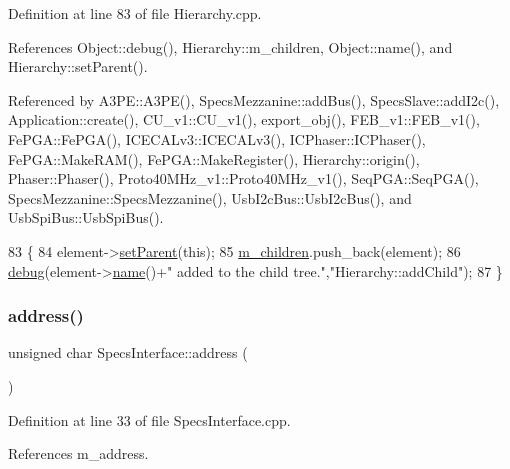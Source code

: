 Definition at line 83 of file Hierarchy.\+cpp.



References Object\+::debug(), Hierarchy\+::m\+\_\+children, Object\+::name(), and Hierarchy\+::set\+Parent().



Referenced by A3\+P\+E\+::\+A3\+P\+E(), Specs\+Mezzanine\+::add\+Bus(), Specs\+Slave\+::add\+I2c(), Application\+::create(), C\+U\+\_\+v1\+::\+C\+U\+\_\+v1(), export\+\_\+obj(), F\+E\+B\+\_\+v1\+::\+F\+E\+B\+\_\+v1(), Fe\+P\+G\+A\+::\+Fe\+P\+G\+A(), I\+C\+E\+C\+A\+Lv3\+::\+I\+C\+E\+C\+A\+Lv3(), I\+C\+Phaser\+::\+I\+C\+Phaser(), Fe\+P\+G\+A\+::\+Make\+R\+A\+M(), Fe\+P\+G\+A\+::\+Make\+Register(), Hierarchy\+::origin(), Phaser\+::\+Phaser(), Proto40\+M\+Hz\+\_\+v1\+::\+Proto40\+M\+Hz\+\_\+v1(), Seq\+P\+G\+A\+::\+Seq\+P\+G\+A(), Specs\+Mezzanine\+::\+Specs\+Mezzanine(), Usb\+I2c\+Bus\+::\+Usb\+I2c\+Bus(), and Usb\+Spi\+Bus\+::\+Usb\+Spi\+Bus().


\begin{DoxyCode}
83                                           \{
84   element->\hyperlink{classHierarchy_a585ad1aeec16077a0e532ab8b4fc557b}{setParent}(\textcolor{keyword}{this});
85   \hyperlink{classHierarchy_a038816763941fd4a930504917f60483b}{m\_children}.push\_back(element);
86   \hyperlink{classObject_aac010553f022165573714b7014a15f0d}{debug}(element->\hyperlink{classObject_a300f4c05dd468c7bb8b3c968868443c1}{name}()+\textcolor{stringliteral}{" added to the child tree."},\textcolor{stringliteral}{"Hierarchy::addChild"});
87 \}
\end{DoxyCode}
\mbox{\label{classSpecsInterface_a0fa039a15b842a5ba783ce825b9915d8}} 
\subsubsection{\texorpdfstring{address()}{address()}}
{\footnotesize\ttfamily unsigned char Specs\+Interface\+::address (\begin{DoxyParamCaption}{ }\end{DoxyParamCaption})}



Definition at line 33 of file Specs\+Interface.\+cpp.



References m\+\_\+address.



